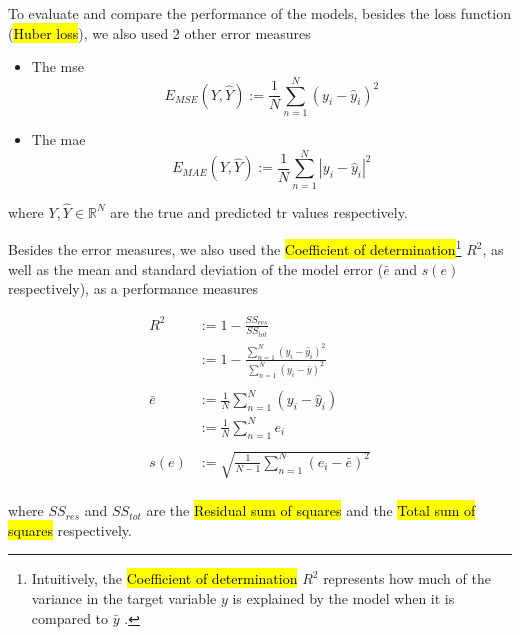 
\glsresetall
\graphicspath{{./Sections/Methodology/Resources/}}

To evaluate and compare the performance of the models, besides the loss function (\hl{Huber loss}), we also used 2 other error measures

\begin{itemize}
  \item The \acrfull{mse}
    \begin{equation}
      E_{MSE}(Y,\hat{Y}) := \frac{1}{N} \sum_{n=1}^N (y_i-\hat{y}_i)^2
    \end{equation}
  \item The \acrfull{mae}
    \begin{equation}
      E_{MAE}(Y,\hat{Y}) := \frac{1}{N} \sum_{n=1}^N |y_i-\hat{y}_i|^2
    \end{equation}
\end{itemize}

\noindent where $Y, \hat{Y} \in \mathbb{R}^N$ are the true and predicted \gls{tr} values respectively.

Besides the error measures, we also used the \hl{Coefficient of determination}\footnote{Intuitively, the \hl{Coefficient of determination} $R^2$ represents how much of the variance in the target variable $y$ is explained by the model when it is compared to $\bar{y}$ \cite{steel1960principles}.} $R^2$, as well as the mean and standard deviation of the model error ($\bar{e}$ and $s(e)$ respectively), as a performance measures

\begin{equation}
  \begin{split}
    R^2 &:= 1 - \frac{SS_{res}}{SS_{tot}} \\
    &:= 1- \frac{\sum_{n=1}^N (y_i-\hat{y}_i)^2}{\sum_{n=1}^N (y_i-\bar{y})^2} \\
    \\
    \bar{e} &:= \frac{1}{N} \sum_{n=1}^N (y_i-\hat{y}_i) \\
    &:= \frac{1}{N} \sum_{n=1}^N e_i \\
    \\
    s(e) &:= \sqrt{\frac{1}{N-1} \sum_{n=1}^N (e_i-\bar{e})^2} \\
  \end{split}
\end{equation}

\noindent where $SS_{res}$ and $SS_{tot}$ are the \hl{Residual sum of squares} and the \hl{Total sum of squares} respectively.
